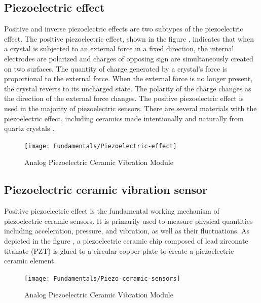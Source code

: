 \subsection{Piezoelectric effect}
\label{sec:PiezoelectricEffect}
Positive and inverse piezoelectric effects are two subtypes of the piezoelectric effect. 
The positive piezoelectric effect, shown in the figure , indicates that when a crystal is subjected to an external force in a fixed direction, 
the internal electrodes are polarized and charges of opposing sign are simultaneously created on two surfaces. 
The quantity of charge generated by a crystal's force is proportional to the external force. 
When the external force is no longer present, the crystal reverts to its uncharged state. 
The polarity of the charge changes as the direction of the external force changes. 
The positive piezoelectric effect is used in the majority of piezoelectric sensors. 
There are several materials with the piezoelectric effect, including ceramics made intentionally and naturally from quartz crystals \cite{bera2016}.

\begin{figure}[htbp]
    \centering
    \texttt{[image: Fundamentals/Piezoelectric-effect]}
    \caption{Analog Piezoelectric Ceramic Vibration Module \cite{PiezoEffect}}
    \label{fig:PiezoEffect}
\end{figure}

\subsection{Piezoelectric ceramic vibration sensor}
\label{sec:PiezoelectricCeramicVibrationSensor}
Positive piezoelectric effect is the fundamental working mechanism of piezoelectric ceramic sensors. 
It is primarily used to measure physical quantities including acceleration, pressure, and vibration, as well as their fluctuations. 
As depicted in the figure , a piezoelectric ceramic chip composed of lead zirconate titanate (PZT) is glued to a 
circular copper plate to create a piezoelectric ceramic element.

\begin{figure}[htbp]
    \centering
    \texttt{[image: Fundamentals/Piezo-ceramic-sensors]}
    \caption{Analog Piezoelectric Ceramic Vibration Module \cite{PiezoSensor}}
    \label{fig:PiezoSensor}
\end{figure}

